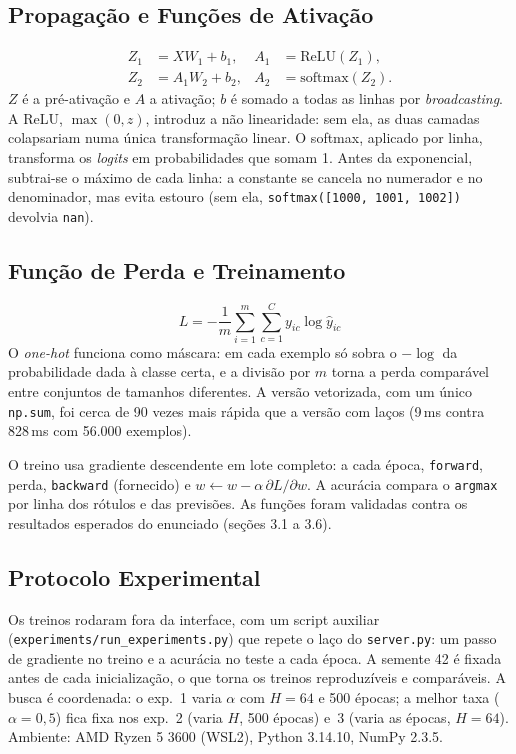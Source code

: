 \documentclass[letterpaper]{article} %
\begin{document}
\subsection{Propagação e Funções de Ativação}
\begin{align*}
Z_1 &= X W_1 + b_1, & A_1 &= \mathrm{ReLU}(Z_1),\\
Z_2 &= A_1 W_2 + b_2, & A_2 &= \mathrm{softmax}(Z_2).
\end{align*}
$Z$ é a pré-ativação e $A$ a ativação; $b$ é somado a todas as linhas por \emph{broadcasting}. A ReLU, $\max(0, z)$, introduz a não linearidade: sem ela, as duas camadas colapsariam numa única transformação linear. O softmax, aplicado por linha, transforma os \emph{logits} em probabilidades que somam 1. Antes da exponencial, subtrai-se o máximo de cada linha: a constante se cancela no numerador e no denominador, mas evita estouro (sem ela, \texttt{softmax([1000, 1001, 1002])} devolvia \texttt{nan}).

\subsection{Função de Perda e Treinamento}
\[
L = -\frac{1}{m} \sum_{i=1}^{m} \sum_{c=1}^{C} y_{ic} \log \hat{y}_{ic}
\]
O \emph{one-hot} funciona como máscara: em cada exemplo só sobra o $-\log$ da probabilidade dada à classe certa, e a divisão por $m$ torna a perda comparável entre conjuntos de tamanhos diferentes. A versão vetorizada, com um único \texttt{np.sum}, foi cerca de 90 vezes mais rápida que a versão com laços (9\,ms contra 828\,ms com 56.000 exemplos).

O treino usa gradiente descendente em lote completo: a cada época, \texttt{forward}, perda, \texttt{backward} (fornecido) e $w \leftarrow w - \alpha\,\partial L / \partial w$. A acurácia compara o \texttt{argmax} por linha dos rótulos e das previsões. As funções foram validadas contra os resultados esperados do enunciado (seções 3.1 a 3.6).

\subsection{Protocolo Experimental}
Os treinos rodaram fora da interface, com um script auxiliar (\texttt{experiments/run\_experiments.py}) que repete o laço do \texttt{server.py}: um passo de gradiente no treino e a acurácia no teste a cada época. A semente 42 é fixada antes de cada inicialização, o que torna os treinos reproduzíveis e comparáveis. A busca é coordenada: o exp.~1 varia $\alpha$ com $H = 64$ e 500 épocas; a melhor taxa ($\alpha = 0{,}5$) fica fixa nos exp.~2 (varia $H$, 500 épocas) e~3 (varia as épocas, $H = 64$). Ambiente: AMD Ryzen 5 3600 (WSL2), Python 3.14.10, NumPy 2.3.5.
\end{document}
